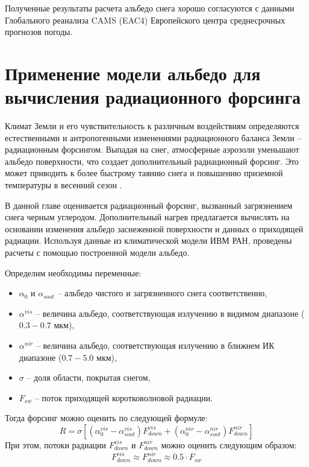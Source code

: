\documentclass[a4paper, fontsize=14pt]{scrartcl}
\begin{document}
Полученные результаты расчета альбедо снега хорошо согласуются с данными Глобального реанализа CAMS (EAC4) Европейского центра среднесрочных прогнозов погоды.


\newpage
\section{Применение модели альбедо для вычисления радиационного форсинга}

Климат Земли и его чувствительность к различным воздействиям определяются естественными и антропогенными изменениями радиационного баланса Земли -- радиационным форсингом. Выпадая на снег, атмосферные аэрозоли уменьшают альбедо поверхности, что создает дополнительный радиационный форсинг. Это может приводить к более быстрому таянию снега и повышению приземной температуры в весенний сезон \cite{Chernenkov2021rus}. 

В данной главе оценивается радиационный форсинг, вызванный загрязнением снега черным углеродом. Дополнительный нагрев предлагается вычислять на основании изменения альбедо заснеженной поверхности и данных о приходящей радиации. Используя данные из климатической модели ИВМ РАН, проведены расчеты с помощью построенной модели альбедо.

Определим необходимы переменные:
\begin{itemize}
    \item $\alpha_{0}$ и $\alpha_{soot}$ -- альбедо чистого и загрязненного снега соответственно,
    \item $\alpha^{vis}$ -- величина альбедо, соответствующая излучению в видимом диапазоне ($0.3-0.7$ мкм),
    \item $\alpha^{nir}$ -- величина альбедо, соответствующая излучению в ближнем ИК диапазоне ($0.7-5.0$ мкм),
    \item $\sigma$ -- доля области, покрытая снегом,
    \item $F_{sw}$ -- поток приходящей коротковолновой радиации.
\end{itemize}
Тогда форсинг можно оценить по следующей формуле:
\begin{equation}
    R = \sigma [ (\alpha_{0}^{vis} - \alpha_{soot}^{vis})F_{down}^{vis} + (\alpha_{0}^{nir} - \alpha_{soot}^{nir})F_{down}^{nir} ] \label{sysFORC}  
\end{equation}
При этом, потоки радиации $F_{down}^{vis}$ и $F_{down}^{nir}$ можно оценить следующим образом: 
\begin{equation}
    F_{down}^{vis} \approx F_{down}^{nir} \approx 0.5 \cdot F_{sw} \label{sys}  
\end{equation}
\end{document}
